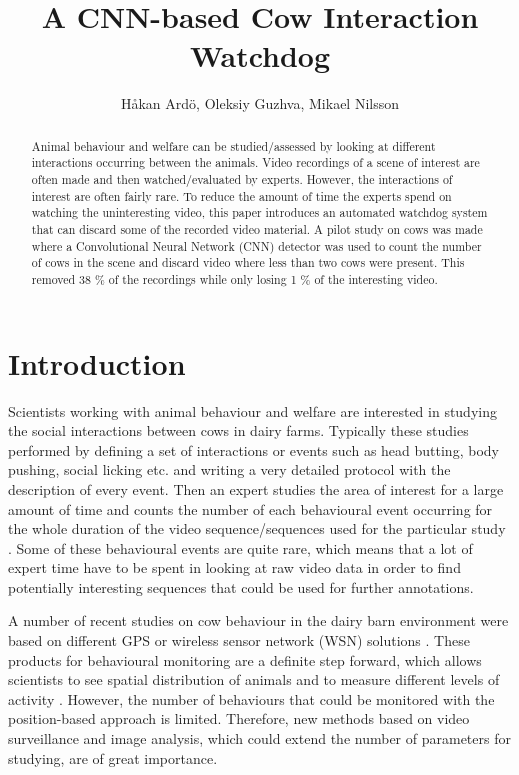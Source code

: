\documentclass[10pt,a4paper,twocolumn]{article}
\author{Håkan Ardö, Oleksiy Guzhva, Mikael Nilsson}
\title{A CNN-based Cow Interaction Watchdog}
\begin{document}
\maketitle

\begin{abstract}

Animal behaviour and welfare can be studied/assessed by looking at different interactions occurring between the animals. Video recordings of a scene of interest are often made and then watched/evaluated by experts. However, the  interactions of interest are often fairly rare. To reduce the amount of time the experts spend on watching the uninteresting video, this paper introduces an automated watchdog system that can discard some of the recorded video material. A pilot study on cows was made where a Convolutional Neural Network (CNN) detector was used to count the number of cows in the scene and discard video where less than two cows were present. This removed 38 \% of the recordings while only losing 1 \% of the interesting video.


\end{abstract}

\section{Introduction}

Scientists working with animal behaviour and welfare are interested in studying the social interactions between cows in dairy farms. Typically these studies performed by defining a set of interactions or events such as head butting, body pushing, social licking etc. and writing a very detailed protocol with the description of every event. Then an expert studies the area of interest for a large amount of time and counts the number of each behavioural event occurring for the whole duration of the video sequence/sequences used for the particular study \cite{MartinandBateson2007}. Some of these behavioural events are quite rare, which means that a lot of expert time have to be spent in looking at raw video data in order to find potentially interesting sequences that could be used for further annotations.

A number of recent studies on cow behaviour in the dairy barn environment were based on different GPS or wireless sensor network (WSN) solutions \cite{Nadimietal2012}. These products for behavioural monitoring are a definite step forward, which allows scientists to see spatial distribution of animals and to measure different levels of activity \cite{Nadimietal2012}. However, the number of behaviours that could be monitored with the position-based approach is limited. Therefore, new methods based on video surveillance and image analysis, which could extend the number of parameters for studying, are of great importance.
\end{document}
